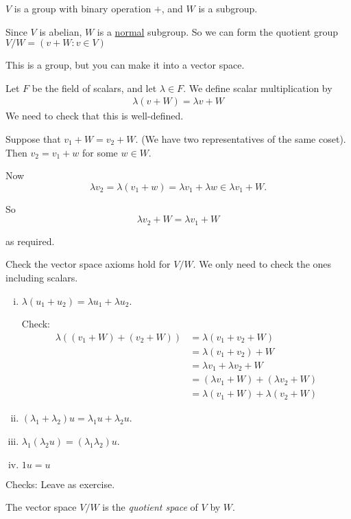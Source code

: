 \documentclass{article}
\theoremstyle{definition} \newtheorem*{definition}{Definition}
\begin{document}
  $V$ is a group with binary operation $+$, and $W$ is a subgroup.
 
  Since $V$ is abelian, $W$ is a \underline{normal} subgroup. So we can form the quotient group $V/W = \left( v+W : v \in V \right)$

  This is a group, but you can make it into a vector space.

  Let $F$ be the field of scalars, and let $\lambda \in F$. We define 
  scalar multiplication by
  \begin{align*}
    \lambda(v + W) = \lambda v + W
  \end{align*}
We need to check that this is well-defined.

Suppose that $v_1 + W = v_2 + W$. (We have two representatives of the same
coset). Then $v_2 = v_1 + w$ for some $w \in W$. 

Now \[
\lambda v_2 = \lambda (v_1 + w) = \lambda v_1 + \lambda w \in \lambda v_1
+ W.\]

So \[
  \lambda v_2 + W = \lambda v_1 + W
\]

as required.

Check the vector space axioms hold for $V/W$. We only need to check the ones including scalars.

\begin{enumerate}[(i)]
  \item 
    $\lambda (u_1 + u_2) = \lambda u_1 + \lambda u_2$.

    Check: 
    \begin{align*}
    \lambda \left( (v_1 + W) + (v_2 + W) \right) &= \lambda \left( v_1 +
    v_2 + W \right) \\
     &= \lambda (v_1 + v_2) + W \\ &= \lambda v_1 + \lambda v_2 + W\\
     &= (\lambda v_1 + W) + (\lambda v_2 + W) \\ &= \lambda(v_1 + W) + \lambda(v_2 + W)
    \end{align*}
  \item
$(\lambda_1 + \lambda_2)u = \lambda_1 u + \lambda_2 u$.
  \item
$\lambda_1 ( \lambda_2u) = (\lambda_1 \lambda_2) u$.
  \item 
$1u = u$
\end{enumerate}

Checks: Leave as exercise.

The vector space $V/W$ is the \emph{quotient space} of $V$ by $W$.
\end{document}
